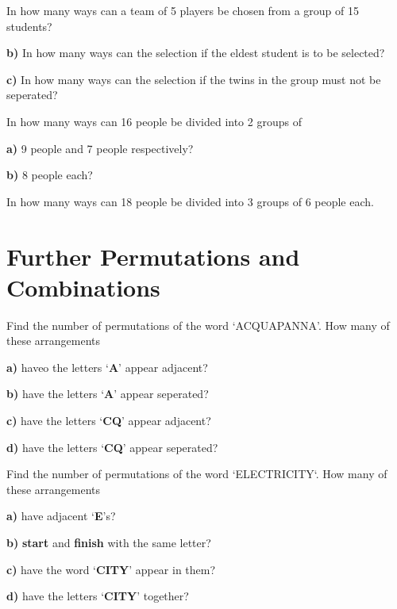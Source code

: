 	\begin{example}
		In how many ways can a team of 5 players be chosen from a group of 15 students?
		
		\quad\textbf{b)} In how many ways can the selection if the eldest student is to be selected?
		
		\quad\textbf{c)} In how many ways can the selection if the twins in the group must not be seperated?
	\end{example}
	
	\begin{example}
		In how many ways can 16 people be divided into 2 groups of 
		
		\quad\textbf{a)} 9 people and 7 people respectively?
		
		\quad\textbf{b)} 8 people each?
	\end{example}
	
	\begin{example}
		In how many ways can 18 people be divided into 3 groups of 6 people each.
	\end{example}
	
	\section{Further Permutations and Combinations}
	
	\begin{example}
	Find the number of permutations of the word `ACQUAPANNA'. How many of these arrangements
		
		\quad\textbf{a)}	haveo the letters `\textbf{A}' appear adjacent?
		
		\quad\textbf{b)}	have the letters `\textbf{A}' appear seperated? 
		
		\quad\textbf{c)}	have the letters `\textbf{CQ}' appear adjacent?
		
		\quad\textbf{d)}	have the letters `\textbf{CQ}' appear seperated? 
	\end{example}
	\begin{example}
							Find the number of permutations of the word `ELECTRICITY`. How many of these arrangements
		
		\quad\textbf{a)}	have adjacent `\textbf{E}'s?
		
		\quad\textbf{b)}	\textbf{start} and \textbf{finish} with the same letter?
		
		\quad\textbf{c)}	have the word `\textbf{CITY}' appear in them?
		
		\quad\textbf{d)}	have the letters `\textbf{CITY}' together?
\end{example}

